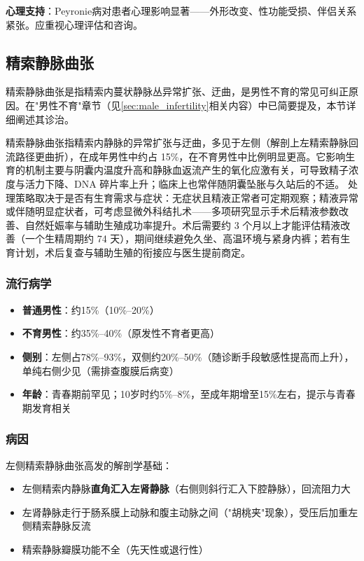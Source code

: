 \documentclass[12pt,a4paper,twoside]{ctexbook}
\begin{document}
\textbf{心理支持}：Peyronie病对患者心理影响显著——外形改变、性功能受损、伴侣关系紧张。应重视心理评估和咨询。

\subsection{精索静脉曲张}
\label{subsec:varicocele}

精索静脉曲张是指精索内蔓状静脉丛异常扩张、迂曲，是男性不育的常见可纠正原因。在"男性不育"章节（见\ref{sec:male_infertility}相关内容）中已简要提及，本节详细阐述其诊治。


精索静脉曲张指精索内静脉的异常扩张与迂曲，多见于左侧（解剖上左精索静脉回流路径更曲折），在成年男性中约占 15\%，在不育男性中比例明显更高。它影响生育的机制主要与阴囊内温度升高和静脉血返流产生的氧化应激有关，可导致精子浓度与活力下降、DNA 碎片率上升；临床上也常伴随阴囊坠胀与久站后的不适。
处理策略取决于是否有生育需求与症状：无症状且精液正常者可定期观察；精液异常或伴随明显症状者，可考虑显微外科结扎术——多项研究显示手术后精液参数改善、自然妊娠率与辅助生殖成功率提升。术后需要约 3 个月以上才能评估精液改善（一个生精周期约 74 天），期间继续避免久坐、高温环境与紧身内裤；若有生育计划，术后复查与辅助生殖的衔接应与医生提前商定。

\subsubsection{流行病学}

\begin{itemize}[leftmargin=2cm]
	\item \textbf{普通男性}：约15\%（10\%--20\%）
	\item \textbf{不育男性}：约35\%--40\%（原发性不育者更高）
	\item \textbf{侧别}：左侧占78\%--93\%，双侧约20\%--50\%（随诊断手段敏感性提高而上升），单纯右侧少见（需排查腹膜后病变）
	\item \textbf{年龄}：青春期前罕见；10岁时约5\%--8\%，至成年期增至15\%左右，提示与青春期发育相关
\end{itemize}

\subsubsection{病因}

左侧精索静脉曲张高发的解剖学基础：
\begin{itemize}[leftmargin=2cm]
	\item 左侧精索内静脉\textbf{直角汇入左肾静脉}（右侧则斜行汇入下腔静脉），回流阻力大
	\item 左肾静脉走行于肠系膜上动脉和腹主动脉之间（"胡桃夹"现象），受压后加重左侧精索静脉反流
	\item 精索静脉瓣膜功能不全（先天性或退行性）
\end{itemize}
\end{document}
